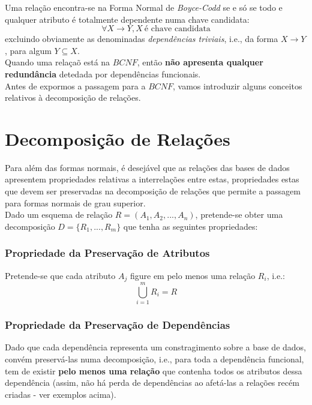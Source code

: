 \documentclass[oneside]{book}
\theoremstyle{definition}
\begin{document}
Uma relação encontra-se na Forma Normal de \textit{Boyce-Codd} se e só se todo e qualquer atributo é totalmente dependente numa chave candidata:
\[
    \forall X \rightarrow Y, X \: \text{é chave candidata}
\]
excluindo obviamente as denominadas \textit{dependências triviais}, i.e., da forma $X \rightarrow Y$, para algum $Y \subseteq X$. \\
Quando uma relaçaõ está na $BCNF$, então \textbf{não apresenta qualquer redundância} detedada por dependências funcionais.\\
Antes de expormos a passagem para a $BCNF$, vamos introduzir alguns conceitos relativos à decomposição de relações.

\section{Decomposição de Relações}

Para além das formas normais, é desejável que as relações das bases de dados apresentem propriedades relativas a interrelações entre estas, propriedades estas que devem ser preservadas na decomposição de relações que permite a passagem para formas normais de grau superior. \\
Dado um esquema de relação $R = (A_1, A_2, ..., A_n)$, pretende-se obter uma decomposição $D = \{ R_1, ..., R_m\}$ que tenha as seguintes propriedades:

\subsubsection*{Propriedade da Preservação de Atributos}

Pretende-se que cada atributo $A_j$ figure em pelo menos uma relação $R_i$, i.e.:
\vspace{-0.3em}
\[
    \bigcup_{i = 1}^{m} R_i = R
\]

\subsubsection*{Propriedade da Preservação de Dependências}

Dado que cada dependência representa um constragimento sobre a base de dados, convém preservá-las numa decomposição, i.e., para toda a dependência funcional, tem de existir \textbf{pelo menos uma relação} que contenha todos os atributos dessa dependência (assim, não há perda de dependências ao afetá-las a relações recém criadas - ver exemplos acima). \\
\end{document}

